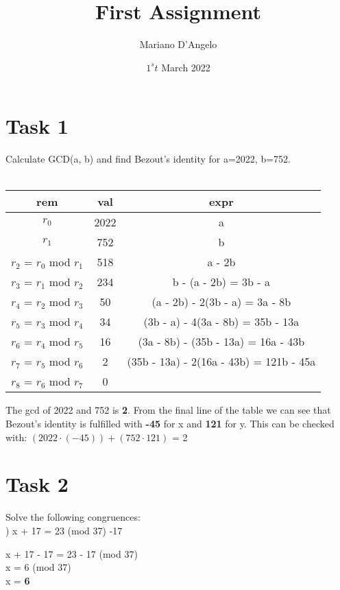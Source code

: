 \documentclass[12pt]{article}
\title{First Assignment}
\author{Mariano D'Angelo}
\date{$1^st$ March 2022}
\begin{document}
\maketitle


\section*{Task 1}
Calculate GCD(a, b) and find Bezout's identity for a=2022, b=752. \\\\
\begin{tabular}{ | c | c | c | } \hline
    \textbf{rem} & \textbf{val} & \textbf{expr} \\ \hline
    $r_0$ & 2022 & a \\
    $r_1$ & 752 & b \\
    $r_2$ = $r_0$ mod $r_1$ & 518 & a - 2b \\
    $r_3$ = $r_1$ mod $r_2$ & 234 & b - (a - 2b) = 3b - a \\
    $r_4$ = $r_2$ mod $r_3$ & 50 & (a - 2b) - 2(3b - a) = 3a - 8b \\
    $r_5$ = $r_3$ mod $r_4$ & 34 & (3b - a) - 4(3a - 8b) = 35b - 13a \\
    $r_6$ = $r_4$ mod $r_5$ & 16 & (3a - 8b) - (35b - 13a) = 16a - 43b \\
    $r_7$ = $r_5$ mod $r_6$ & 2 & (35b - 13a) - 2(16a - 43b) = 121b - 45a \\ \hline
    $r_8$ = $r_6$ mod $r_7$ & 0 & \\ \hline
\end{tabular}

\noindent \newline \newline The gcd of 2022 and 752 is \textbf{2}. \newline
From the final line of the table we can see that Bezout's identity is fulfilled
with \textbf{-45} for x and \textbf{121} for y.\newline
This can be checked with: $(2022 \cdot (-45)) + (752 \cdot 121)$ = 2

\pagebreak


\section*{Task 2} 

Solve the following congruences: \\

) x + 17 = 23 (mod 37) \textbar{} -17
\begin{addmargin}[1.22em]{0em}
x + 17 - 17 = 23 - 17 (mod 37) \\
x = 6 (mod 37) \\
x = \textbf{6} \\
\end{addmargin}
\end{document}
